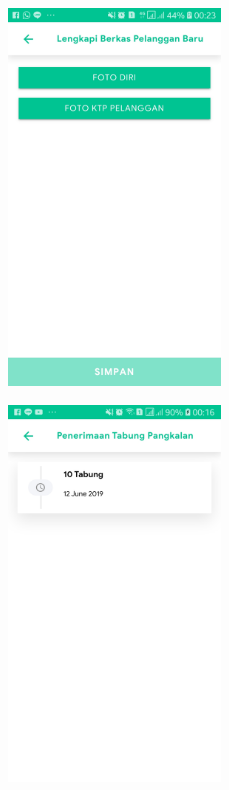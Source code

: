 	\begin{figure}[H]
		\centering
		\begin{minipage}[b]{0.4\linewidth}
			\centering
			\includegraphics [width = \linewidth, height=10cm]{gambar/android/berkas-register}
			\label{tampilanUnggahBerkas}
		\end{minipage}
		\begin{minipage}[b]{0.4\linewidth}
			\centering
			\includegraphics [width = \linewidth, height=10cm]{gambar/android/penerimaan}
			\label{tampilanPenerimaanPangkalan}
		\end{minipage}
		
	\end{figure}

